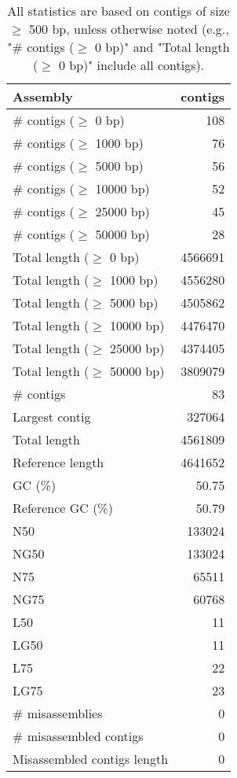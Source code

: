 \documentclass[12pt,a4paper]{article}
\begin{document}
\begin{table}[ht]
\begin{center}
\caption{All statistics are based on contigs of size $\geq$ 500 bp, unless otherwise noted (e.g., "\# contigs ($\geq$ 0 bp)" and "Total length ($\geq$ 0 bp)" include all contigs).}
\begin{tabular}{|l*{1}{|r}|}
\hline
Assembly & contigs \\ \hline
\# contigs ($\geq$ 0 bp) & 108 \\ \hline
\# contigs ($\geq$ 1000 bp) & 76 \\ \hline
\# contigs ($\geq$ 5000 bp) & 56 \\ \hline
\# contigs ($\geq$ 10000 bp) & 52 \\ \hline
\# contigs ($\geq$ 25000 bp) & 45 \\ \hline
\# contigs ($\geq$ 50000 bp) & 28 \\ \hline
Total length ($\geq$ 0 bp) & 4566691 \\ \hline
Total length ($\geq$ 1000 bp) & 4556280 \\ \hline
Total length ($\geq$ 5000 bp) & 4505862 \\ \hline
Total length ($\geq$ 10000 bp) & 4476470 \\ \hline
Total length ($\geq$ 25000 bp) & 4374405 \\ \hline
Total length ($\geq$ 50000 bp) & 3809079 \\ \hline
\# contigs & 83 \\ \hline
Largest contig & 327064 \\ \hline
Total length & 4561809 \\ \hline
Reference length & 4641652 \\ \hline
GC (\%) & 50.75 \\ \hline
Reference GC (\%) & 50.79 \\ \hline
N50 & 133024 \\ \hline
NG50 & 133024 \\ \hline
N75 & 65511 \\ \hline
NG75 & 60768 \\ \hline
L50 & 11 \\ \hline
LG50 & 11 \\ \hline
L75 & 22 \\ \hline
LG75 & 23 \\ \hline
\# misassemblies & 0 \\ \hline
\# misassembled contigs & 0 \\ \hline
Misassembled contigs length & 0 \\ \hline

\end{tabular}
\end{center}
\end{table}
\end{document}
